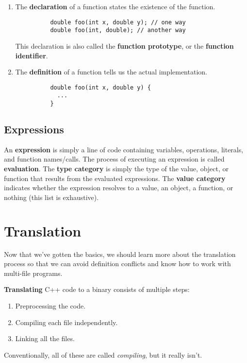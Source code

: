 \documentclass{article}
\begin{document}
    \begin{enumerate}
      \item The \textbf{declaration} of a function states the existence of the function. 
        \begin{lstlisting}
          double foo(int x, double y); // one way 
          double foo(int, double); // another way 
        \end{lstlisting}
        This declaration is also called the \textbf{function prototype}, or the \textbf{function identifier}. 

      \item The \textbf{definition} of a function tells us the actual implementation. 
        \begin{lstlisting}
          double foo(int x, double y) {
            ...
          }
        \end{lstlisting}
    \end{enumerate}

  \subsection{Expressions}

    \begin{definition}[Expression]
      An \textbf{expression} is simply a line of code containing variables, operations, literals, and function names/calls. The process of executing an expression is called \textbf{evaluation}. The \textbf{type category} is simply the type of the value, object, or function that results from the evaluated expressions. The \textbf{value category} indicates whether the expression resolves to a value, an object, a function, or nothing (this list is exhaustive). 
    \end{definition}

\section{Translation} 

    Now that we've gotten the basics, we should learn more about the translation process so that we can avoid definition conflicts and know how to work with multi-file programs. 

    \begin{definition}[Translation]
      \textbf{Translating} C++ code to a binary consists of multiple steps: 
      \begin{enumerate}
        \item Preprocessing the code. 
        \item Compiling each file independently. 
        \item Linking all the files. 
      \end{enumerate}
      Conventionally, all of these are called \textit{compiling}, but it really isn't. 
    \end{definition}
\end{document}
